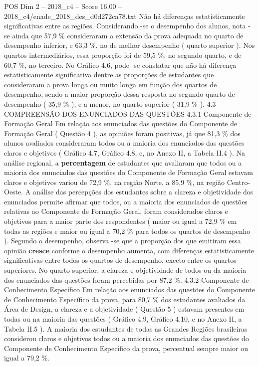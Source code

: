 \begin{textsample}{POS Dim 2 – 2018\_c4 – Score 16.00 – 2018\_c4/enade\_2018\_des\_d0d272ca78.txt}
Não há diferenças estatisticamente significativas entre as regiões.
Considerando -se o desempenho dos alunos, nota -se ainda que 57,9 \% consideraram a extensão da prova adequada no quarto de desempenho inferior, e 63,3 \%, no de melhor desempenho ( quarto superior ).
Nos quartos intermediários, essa proporção foi de 59,5 \%, no segundo quarto, e de 60,7 \%, no terceiro.
No Gráfico 4.6, pode -se constatar que não há diferença estatisticamente significativa dentre as proporções de estudantes que consideraram a prova longa ou muito longa em função dos quartos de desempenho, sendo a maior proporção dessa resposta no segundo quarto de desempenho ( 35,9 \% ), e a menor, no quarto superior ( 31,9 \% ). 4.3 COMPREENSÃO DOS ENUNCIADOS DAS QUESTÕES 4.3.1 Componente de Formação Geral Em relação aos enunciados das questões do Componente de Formação Geral ( Questão 4 ), as opiniões foram positivas, já que 81,3 \% dos alunos avaliados consideraram todos ou a maioria dos enunciados das questões claros e objetivos ( Gráfico 4.7, Gráfico 4.8, e, no Anexo II, a Tabela II.4 ).
Na análise regional, a \textbf{percentagem} de estudantes que avaliaram que todos ou a maioria dos enunciados das questões do Componente de Formação Geral estavam claros e objetivos variou de 72,9 \%, na região Norte, a 85,9 \%, na região Centro-Oeste.
A análise das percepções dos estudantes sobre a clareza e objetividade dos enunciados permite afirmar que todos, ou a maioria dos enunciados de questões relativas ao Componente de Formação Geral, foram considerados claros e objetivos para a maior parte dos respondentes ( maior ou igual a 72,9 \% em todas as regiões e maior ou igual a 70,2 \% para todos os quartos de desempenho ).
Segundo o desempenho, observa -se que a proporção dos que emitiram essa opinião \textbf{cresce} conforme o desempenho aumenta, com diferenças estatisticamente significativas entre todos os quartos de desempenho, exceto entre os quartos superiores.
No quarto superior, a clareza e objetividade de todos ou da maioria dos enunciados das questões foram percebidas por 87,2 \%. 4.3.2 Componente de Conhecimento Específico Em relação aos enunciados das questões do Componente de Conhecimento Específico da prova, para 80,7 \% dos estudantes avaliados da Área de Design, a clareza e a objetividade ( Questão 5 ) estavam presentes em todas ou na maioria das questões ( Gráfico 4.9, Gráfico 4.10, e no Anexo II, a Tabela II.5 ).
A maioria dos estudantes de todas as Grandes Regiões brasileiras considerou claros e objetivos todos ou a maioria dos enunciados das questões do Componente de Conhecimento Específico da prova, percentual sempre maior ou igual a 79,2 \%.

\end{textsample}
